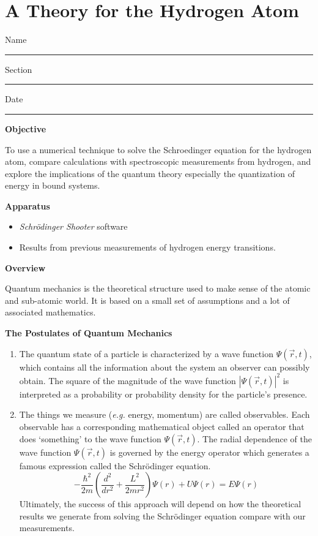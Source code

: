 \setcounter{equation}{0}
\setcounter{figure}{0}

\section{A Theory for the Hydrogen Atom}

Name \rule{2.0in}{0.1pt}\hfill{}Section \rule{1.0in}{0.1pt}\hfill{}Date
\rule{1.0in}{0.1pt}

\textbf{Objective}

To use a numerical technique to solve the Schroedinger equation for the hydrogen atom,
compare calculations with spectroscopic measurements from hydrogen,
 and explore
the implications of the quantum theory especially the quantization of energy
in bound systems.

\textbf{Apparatus}

\begin{itemize}

\item {\it Schr\"odinger Shooter} software

\item Results from previous measurements of hydrogen energy transitions.

\end{itemize}

\textbf{Overview}

Quantum mechanics is the theoretical structure used to make sense of the atomic and sub-atomic
world. 
It is based on a small set of assumptions and a lot of associated mathematics.

\begin{center}
\bf The Postulates of Quantum Mechanics
\end{center}

\begin{enumerate}

\item The quantum state of a particle is characterized by a wave function  
$\Psi(\vec r,t)$, which contains all the information about the system an observer can 
possibly obtain.
The square of the magnitude of the wave function $|\Psi (\vec r,t)|^2$ 
is interpreted as a probability or probability density for the particle's presence. 

\item The things we measure ({\it e.g.} energy, momentum) are called observables. 
Each observable has a corresponding mathematical object called an operator 
that does `something' to the wave function $\Psi(\vec r,t)$.
The radial dependence of the wave function $\Psi(\vec r,t)$ is governed by
the energy operator which generates a famous expression called the
Schr\"odinger equation.
\begin{equation}
-\frac{\hbar^2}{2 m}\left ( \frac{d^2}{d r^2} +  
   \frac{L^2}{2 m r^2} \right ) \Psi(r) + U \Psi(r) = E  \Psi(r)
\end{equation}
Ultimately, the success of this approach will depend on how the theoretical
results we generate from solving the Schr\"odinger equation compare with
our measurements.

\end{enumerate}

